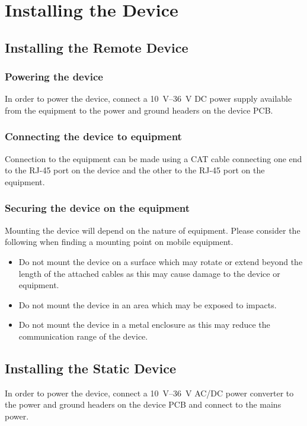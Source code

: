 
\section{Installing the Device} %
\label{sec:installing_the_device}
\subsection{Installing the Remote Device} %
\label{sub:installing_the_remote_device}
\subsubsection{Powering the device} %
\label{ssub:powering_the_device}
In order to power the device, connect a \SIrange{10}{36}{\volt} DC power supply available from the equipment to the power and ground headers on the device PCB.
\subsubsection{Connecting the device to equipment} %
\label{ssub:connecting_the_device_to_equipment}
Connection to the equipment can be made using a CAT cable connecting one end to the RJ-45 port on the device and the other to the RJ-45 port on the equipment.
\subsubsection{Securing the device on the equipment} %
\label{ssub:securing_the_device_on_the_equimpent}
Mounting the device will depend on the nature of equipment. Please consider the following when finding a mounting point on mobile equipment.
\begin{itemize}
	\item Do not mount the device on a surface which may rotate or extend beyond the length of the attached cables as this may cause damage to the device or equipment.
	\item Do not mount the device in an area which may be exposed to impacts.
	\item Do not mount the device in a metal enclosure as this may reduce the communication range of the device.
\end{itemize}
\subsection{Installing the Static Device} %
\label{sub:installing_the_static_device}
\label{ssub:powering_the_device}
In order to power the device, connect a \SIrange{10}{36}{\volt} AC/DC power converter to the power and ground headers on the device PCB and connect to the mains power.
